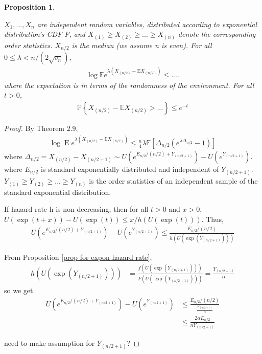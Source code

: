 \documentclass{article}
\theoremstyle{plain}
\newtheorem{prop}{Proposition}
\begin{document}
\begin{prop}
\label{prop 4.6}

$X_1, ..., X_n$ are independent random variables, distributed according to exponential distribution's CDF F, and $X_{(1)} \geq X_{(2)} \geq ... \geq X_{(n)}$ denote the corresponding order statistics. $X_{n/2}$ is the median (we assume n is even). For all $0 \leq \lambda<n /\left(2 \sqrt{v_{n}}\right)$, 
\begin{align}
    \log \mathbb{E}e^{\lambda\left(X_{(n / 2)}-\mathrm{E} X_{(n / 2)}\right)} \leq ....
\end{align}
where the expectation is in terms of the randomness of the environment. For all $t > 0$,
\begin{align}
    \mathbb{P}\left\{X_{(n / 2)}-\mathbb{E} X_{(n / 2)}>...\right\} \leq e^{-t}
\end{align}
\end{prop}

\begin{proof}
By \cite{boucheron2012} Theorem 2.9, 
\begin{align}
    \log \operatorname{E} e^{\lambda\left(X_{(n / 2)}-\mathbb{E} X_{(n / 2)}\right)} \leq \frac{n}{4} \lambda \mathbb{E}\left[\Delta_{n / 2}\left(e^{\lambda \Delta_{n / 2}}-1\right)\right]
\end{align}
where $\Delta_{n / 2}=X_{(n / 2)}-X_{(n / 2+1)} \sim U\left(e^{E_{n / 2} /(n / 2)+Y_{(n / 2+1)}} \right)-U\left(e^{Y_{(n / 2+1)}}\right).$ where $E_{n/2}$ is standard exponentially distributed and independent of $Y_{(n/2 + 1)}$. $Y_{(1)} \geq Y_{(2)} \geq ... \geq Y_{(n)}$ is the order statistics of an independent sample of the standard exponential distribution. 

If hazard rate h is non-decreasing, then for all $t > 0$ and $x > 0$, $U(\exp (t+x))-U(\exp (t)) \leq x / h(U(\exp (t)))$. Thus, 
\begin{align}
    U\left(e^{E_{n / 2} /(n / 2)+Y_{(n / 2+1)}} \right)-U\left(e^{Y_{(n / 2+1)}}\right) \leq \frac{E_{n / 2} /(n / 2)}{h(U(\exp{(Y_{(n/2+1)})}))}
\end{align}

From Proposition \ref{prop for expon hazard rate}, 
\begin{align}
    h(U(\exp{(Y_{(n/2+1)})})) &= \frac{f(U(\exp (Y_{(n/2+1)})))}{\overline{F}({U}(\exp (Y_{(n/2+1)})))} = \frac{Y_{(n/2+1)}}{\alpha} 
\end{align}
so we get 
\begin{align}
    U\left(e^{E_{n / 2} /(n / 2)+Y_{(n / 2+1)}} \right)-U\left(e^{Y_{(n / 2+1)}}\right) 
    &\leq \frac{E_{n / 2} /(n / 2)}{\frac{Y_{(n/2+1)}}{\alpha} }\\
    &\leq \frac{ 2\alpha E_{n / 2} }{n Y_{(n/2+1)}}
\end{align}

need to make assumption for $Y_{(n/2+1)}$?
\end{proof}


\printbibliography
\end{document}
